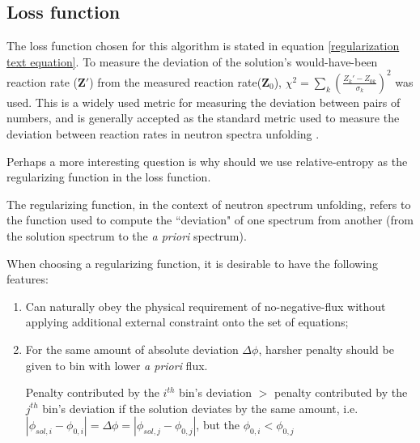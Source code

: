 \documentclass[a4paper, 12pt]{article}
\newcommand{\ve}[1]{\boldsymbol{#1}}
\newcommand{\apriori}[0]{\textit{a priori} }
\begin{document}
\subsection{Loss function}\label{justification}
    The loss function chosen for this algorithm is stated in equation \ref{regularization text equation}.
    To measure the deviation of the solution's would-have-been reaction rate ($\ve{Z}'$) from the measured reaction rate($\ve{Z}_0$), $\chi^2 = \sum\limits_k (\frac{Z_k' -Z_{0k}}{\sigma_k})^2$ was used.
    This is a widely used metric for measuring the deviation between pairs of numbers, and is generally accepted as the standard metric used to measure the deviation between reaction rates in neutron spectra unfolding \cite{MatzkeUnfoldingProcedure}\cite{Linden1995_Article_Maximum-entropyDataAnalysis}.

    Perhaps a more interesting question is why should we use relative-entropy as the regularizing function in the loss function.

    The regularizing function, in the context of neutron spectrum unfolding, refers to the function used to compute the ``deviation" of one spectrum from another (from the solution spectrum to the \apriori spectrum).

    When choosing a regularizing function, it is desirable to have the following features:
\begin{enumerate}
    \item Can naturally obey the physical requirement of no-negative-flux without applying additional external constraint onto the set of equations;
    \item For the same amount of absolute deviation $\Delta \phi$, harsher penalty should be given to bin with lower \apriori flux.
        
        Penalty contributed by the $i^{th}$ bin's deviation $>$ penalty contributed by the $j^{th}$ bin's deviation if the solution deviates by the same amount, i.e. $|\phi_{sol,i}-\phi_{0,i}|=\Delta\phi=|\phi_{sol,j}-\phi_{0,j}|$, but the $\phi_{0,i}<\phi_{0,j}$
\end{enumerate}
\end{document}
